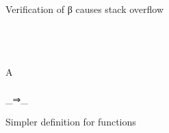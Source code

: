 Verification of β causes stack overflow

\begin{code}\>\<%
\\
%
\\
\> \AgdaSymbol{:} \AgdaSymbol{\{} \AgdaSymbol{:} \AgdaSymbol{\}(}  \AgdaSymbol{:}  \AgdaSymbol{)}   \<%
\\
\>   \AgdaSymbol{=}   \AgdaSymbol{(} \AgdaFunction{[}  \AgdaSymbol{\{}A \AgdaSymbol{=} \AgdaSymbol{\}} \AgdaFunction{]T}\AgdaSymbol{)}\<%
\\
%
\\
\>  \_⇒\_\<%
\\
\>\<\end{code}

Simpler definition for functions


